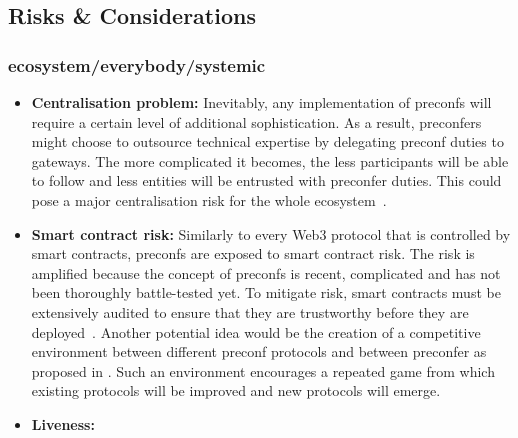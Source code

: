 \documentclass[a4paper]{article}
\theoremstyle{boldstyle}
\begin{document}
    \subsection{Risks \& Considerations} %
    \subsubsection{ecosystem/everybody/systemic}

    \begin{itemize}
        \item \textbf{Centralisation problem:} Inevitably, any implementation of preconfs will require a certain level of additional sophistication. As a result, preconfers might choose to outsource technical expertise by delegating preconf duties to gateways. The more complicated it becomes, the less participants will be able to follow and less entities will be entrusted with preconfer duties. This could pose a major centralisation risk for the whole ecosystem~\cite{W:DelegationinBolt:OutsourcingSophisticationWhilePreservingDecentralization,W:BecomingBased:APathtowardsDecentralisedSequencing}.
        
        \item \textbf{Smart contract risk:} Similarly to every Web3 protocol that is controlled by smart contracts, preconfs are exposed to smart contract risk. The risk is amplified because the concept of preconfs is recent, complicated and has not been thoroughly battle-tested yet. To mitigate risk, smart contracts must be extensively audited to ensure that they are trustworthy before they are deployed~\cite{W:CrediblyNeutralPreconfirmationCollateral:ThePreconfirmationRegistry}. Another potential idea would be the creation of a competitive environment between different preconf protocols and between preconfer as proposed in \cite{W:ThePreconfirmationSauna}. Such an environment encourages a repeated game from which existing protocols will be improved and new protocols will emerge.
    
        \item \textbf{Liveness:} %
        

\end{itemize}
\end{document}
